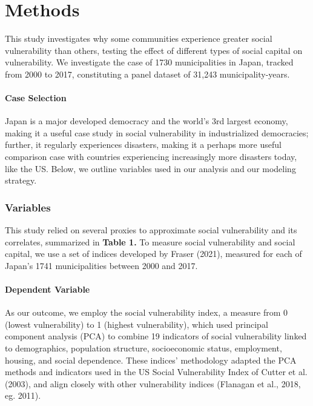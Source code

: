 \documentclass[]{elsarticle} %
\begin{document}
\hypertarget{methods}{%
\section{Methods}\label{methods}}

This study investigates why some communities experience greater social
vulnerability than others, testing the effect of different types of
social capital on vulnerability. We investigate the case of 1730
municipalities in Japan, tracked from 2000 to 2017, constituting a panel
dataset of 31,243 municipality-years.

\hypertarget{case-selection}{%
\paragraph{Case Selection}\label{case-selection}}

Japan is a major developed democracy and the world's 3rd largest
economy, making it a useful case study in social vulnerability in
industrialized democracies; further, it regularly experiences disasters,
making it a perhaps more useful comparison case with countries
experiencing increasingly more disasters today, like the US. Below, we
outline variables used in our analysis and our modeling strategy.

\hypertarget{variables}{%
\subsubsection{Variables}\label{variables}}

This study relied on several proxies to approximate social vulnerability
and its correlates, summarized in \textbf{Table 1.} To measure social
vulnerability and social capital, we use a set of indices developed by
Fraser (2021), measured for each of Japan's 1741 municipalities between
2000 and 2017.

\hypertarget{dependent-variable}{%
\paragraph{Dependent Variable}\label{dependent-variable}}

As our outcome, we employ the social vulnerability index, a measure from
0 (lowest vulnerability) to 1 (highest vulnerability), which used
principal component analysis (PCA) to combine 19 indicators of social
vulnerability linked to demographics, population structure,
socioeconomic status, employment, housing, and social dependence. These
indices' methodology adapted the PCA methods and indicators used in the
US Social Vulnerability Index of Cutter et al. (2003), and align closely
with other vulnerability indices (Flanagan et al., 2018, eg. 2011).
\end{document}
